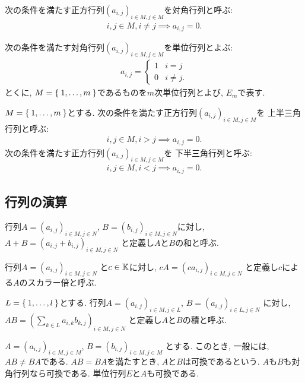 \begin{definition}
次の条件を満たす正方行列$(a_{i,j})_{i\in M, j\in M}$を対角行列と呼ぶ:
\begin{align*}
i,j\in M, i\neq j \implies a_{i,j}=0.
\end{align*}
\end{definition}


次の条件を満たす対角行列$(a_{i,j})_{i\in M, j\in M}$を単位行列とよぶ:
\begin{align*}
a_{i,j}=
\begin{cases}
1&i=j\\
0&i\neq j.
\end{cases}
\end{align*}
とくに, $M=\Set{1,\ldots,m}$であるものを$m$次単位行列とよび, $E_m$で表す.


\begin{definition}
$M=\Set{1,\ldots,m}$とする.
次の条件を満たす正方行列$(a_{i,j})_{i\in M, j\in M}$を
上半三角行列と呼ぶ:
\begin{align*}
i,j\in M, i>j \implies a_{i,j}=0.
\end{align*}
次の条件を満たす正方行列$(a_{i,j})_{i\in M, j\in M}$を
下半三角行列と呼ぶ:
\begin{align*}
i,j\in M, i<j \implies a_{i,j}=0.
\end{align*}
\end{definition}


\subsection{行列の演算}

\begin{definition}
行列$A=(a_{i,j})_{i\in M, j\in N}$,
$B=(b_{i,j})_{i\in M, j\in N}$に対し,
$A+B=(a_{i,j}+b_{i,j})_{i\in M, j\in N}$
と定義し$A$と$B$の和と呼ぶ.
\end{definition}
\begin{definition}
行列$A=(a_{i,j})_{i\in M, j\in N}$
と$c\in \mathbb{K}$に対し,
$cA=(ca_{i,j})_{i\in M, j\in N}$
と定義し$c$による$A$のスカラー倍と呼ぶ.
\end{definition}
\begin{definition}
$L=\Set{1,\ldots,l}$とする.
行列$A=(a_{i,j})_{i\in M, j\in L}$,
$B=(a_{i,j})_{i\in L, j\in N}$
に対し,
$AB=(\sum_{k\in L}a_{i,k}b_{k,j})_{i\in M, j\in N}$
と定義し$A$と$B$の積と呼ぶ.
\end{definition}
\begin{remark}
$A=(a_{i,j})_{i\in M, j\in M}$,
$B=(b_{i,j})_{i\in M, j\in M}$
とする.
このとき,
一般には,
$AB\neq BA$である.
$AB=BA$を満たすとき,
$A$と$B$は可換であるという.
$A$も$B$も対角行列なら可換である.
単位行列$E$と$A$も可換である.
\end{remark}


